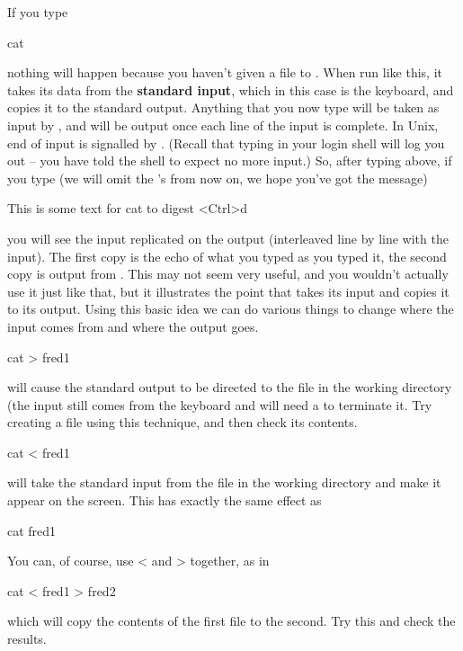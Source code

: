 If you type  
\begin{ttoutenv}
cat \return
\end{ttoutenv}
nothing will happen because you haven't given a file to .
When run like this, it takes its data from the \textbf{standard input},
which in this case is the keyboard, and copies it to the standard
output. Anything that you now type will be taken as input by
, and will be output once each line of the input is
complete. In Unix, end of input is signalled by .
(Recall that typing  in your login shell will log you
out -- you have told the shell to expect no more input.) So, after
typing  above, if you type (we will omit the \return's
from now on, we hope you've got the message)
\begin{ttoutenv}
This is
some 
text for cat to 
digest
<Ctrl>d
\end{ttoutenv}
you will see the input replicated on the output (interleaved line by
line with the input). The first copy is the echo of what you typed as
you typed it, the second copy is output from . This may
not seem very useful, and you wouldn't actually use it just like that,
but it illustrates the point that  takes its input and copies it
to its output. Using this basic idea we can do various things to
change where the input comes from and where the output goes.

\begin{ttoutenv}
cat > fred1
\end{ttoutenv}
will cause the standard output to be directed to the file 
in the working directory (the input still comes from the keyboard and
will need a  to terminate it. Try creating a file
 using this technique, and then check its contents.

\begin{ttoutenv}
cat < fred1 
\end{ttoutenv}
will take the standard input from the file 
in the working directory and make it appear on the screen. This has
exactly the same effect as 
\begin{ttoutenv}
cat fred1 
\end{ttoutenv}

You can, of course, use < and > together, as in
\begin{ttoutenv}
cat < fred1 > fred2
\end{ttoutenv}
which will copy the contents of the first file to the second. Try this and
check the results.

